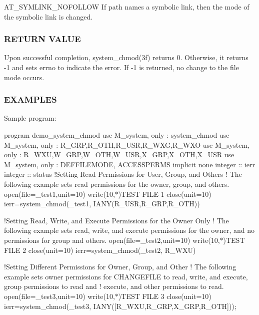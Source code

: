 A\+T\+\_\+\+S\+Y\+M\+L\+I\+N\+K\+\_\+\+N\+O\+F\+O\+L\+L\+OW If path names a symbolic link, then the mode of the symbolic link is changed.

\subsubsection*{R\+E\+T\+U\+RN V\+A\+L\+UE}

Upon successful completion, system\+\_\+chmod(3f) returns 0. Otherwise, it returns -\/1 and sets errno to indicate the error. If -\/1 is returned, no change to the file mode occurs.

\subsubsection*{E\+X\+A\+M\+P\+L\+ES}

Sample program\+:

program demo\+\_\+system\+\_\+chmod use M\+\_\+system, only \+: system\+\_\+chmod use M\+\_\+system, only \+: R\+\_\+\+G\+RP,R\+\_\+\+O\+TH,R\+\_\+\+U\+SR,R\+\_\+\+W\+XG,R\+\_\+\+W\+XO use M\+\_\+system, only \+: R\+\_\+\+W\+XU,W\+\_\+\+G\+RP,W\+\_\+\+O\+TH,W\+\_\+\+U\+SR,X\+\_\+\+G\+RP,X\+\_\+\+O\+TH,X\+\_\+\+U\+SR use M\+\_\+system, only \+: D\+E\+F\+F\+I\+L\+E\+M\+O\+DE, A\+C\+C\+E\+S\+S\+P\+E\+R\+MS implicit none integer \+:\+: ierr integer \+:\+: status !\+Setting Read Permissions for User, Group, and Others ! The following example sets read permissions for the owner, group, and others. open(file=\textquotesingle{}\+\_\+test1\textquotesingle{},unit=10) write(10,$\ast$)\textquotesingle{}T\+E\+ST F\+I\+LE 1\textquotesingle{} close(unit=10) ierr=system\+\_\+chmod(\textquotesingle{}\+\_\+test1\textquotesingle{}, I\+A\+N\+Y(\+R\+\_\+\+U\+S\+R,\+R\+\_\+\+G\+R\+P,\+R\+\_\+\+O\+T\+H))

!\+Setting Read, Write, and Execute Permissions for the Owner Only ! The following example sets read, write, and execute permissions for the owner, and no permissions for group and others. open(file=\textquotesingle{}\+\_\+test2\textquotesingle{},unit=10) write(10,$\ast$)\textquotesingle{}T\+E\+ST F\+I\+LE 2\textquotesingle{} close(unit=10) ierr=system\+\_\+chmod(\textquotesingle{}\+\_\+test2\textquotesingle{}, R\+\_\+\+W\+XU)

!\+Setting Different Permissions for Owner, Group, and Other ! The following example sets owner permissions for C\+H\+A\+N\+G\+E\+F\+I\+LE to read, write, and execute, group permissions to read and ! execute, and other permissions to read. open(file=\textquotesingle{}\+\_\+test3\textquotesingle{},unit=10) write(10,$\ast$)\textquotesingle{}T\+E\+ST F\+I\+LE 3\textquotesingle{} close(unit=10) ierr=system\+\_\+chmod(\textquotesingle{}\+\_\+test3\textquotesingle{}, I\+A\+N\+Y(\mbox{[}\+R\+\_\+\+W\+X\+U,\+R\+\_\+\+G\+R\+P,\+X\+\_\+\+G\+R\+P,\+R\+\_\+\+O\+T\+H\mbox{]}));

